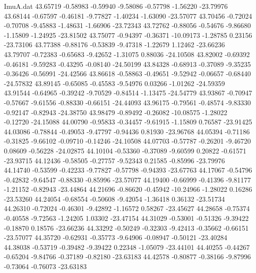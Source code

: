 \begin{filecontents}{ImuA.dat}
  43.65719   -0.58983   -0.59940   -9.58086   -0.57798   -1.56220  -23.79976
  43.68144   -0.67597   -0.46181   -9.77827   -1.40234   -1.63090  -23.57077
  43.70456   -0.72024   -0.70708   -9.45883   -1.48631   -1.66906  -23.72343
  43.72762   -0.88056   -0.54676   -9.86680   -1.15809   -1.24925  -23.81502
  43.75077   -0.94397   -0.36371  -10.09173   -1.28785    0.23156  -23.73106
  43.77388   -0.88176   -0.53839   -9.47318   -1.22679    1.12462  -23.66236
  43.79707   -0.72383   -0.65683   -9.42652   -1.31075    0.88036  -24.10508
  43.82002   -0.69392   -0.46181   -9.59283   -0.43295   -0.08140  -24.50199
  43.84328   -0.68913   -0.37089   -9.35235   -0.36426   -0.56991  -24.42566
  43.86618   -0.58863   -0.49651   -9.52942   -0.06657   -0.68440  -24.57832
  43.89145   -0.65085   -0.45583   -9.54976    0.03266   -1.01262  -24.59359
  43.91544   -0.64965   -0.39242   -9.70529   -0.84514   -1.13475  -24.54779
  43.93867   -0.70947   -0.57667   -9.61556   -0.88330   -0.66151  -24.44093
  43.96175   -0.79561   -0.48574   -9.83330   -0.92147   -0.82943  -24.38750
  43.98479   -0.89492   -0.26082  -10.08575   -1.28022   -0.12720  -24.15088
  44.00790   -0.95833   -0.34457   -9.61915   -1.15809    0.76587  -23.91425
  44.03086   -0.78844   -0.49053   -9.47797   -0.94436    0.81930  -23.96768
  44.05394   -0.71186   -0.31825   -9.66102   -0.09710   -0.14246  -24.10508
  44.07703   -0.57787   -0.26201   -9.46720    0.08609   -0.56228  -24.02875
  44.10104   -0.53360   -0.37089   -9.60599    0.20822   -0.61571  -23.93715
  44.12436   -0.58505   -0.27757   -9.52343    0.21585   -0.85996  -23.79976
  44.14740   -0.53599   -0.42233   -9.77827   -0.57798   -0.94393  -23.67763
  44.17067   -0.54796   -0.42832   -9.64547   -0.88330   -0.85996  -23.57077
  44.19400   -0.66999   -0.41396   -9.81177   -1.21152   -0.82943  -23.44864
  44.21696   -0.86620   -0.45942  -10.24966   -1.28022    0.16286  -23.53260
  44.24054   -0.68554   -0.50608   -9.42054   -1.36418    0.36132  -23.51734
  44.26310   -0.72024   -0.46301   -9.42892   -1.16572    0.58267  -23.45627
  44.28658   -0.75374   -0.40558   -9.72563   -1.24205    1.03302  -23.47154
  44.31029   -0.53001   -0.51326   -9.39422   -0.18870    0.18576  -23.66236
  44.33292   -0.50249   -0.32303   -9.42413   -0.35662   -0.66151  -23.57077
  44.35720   -0.62931   -0.35773   -9.64906   -0.08947   -0.50121  -23.40284
  44.38038   -0.53719   -0.39482   -9.39422    0.22348   -1.05079  -23.44101
  44.40255   -0.44267   -0.65204   -9.84766   -0.37189   -0.82180  -23.63183
  44.42578   -0.80877   -0.38166   -9.87996   -0.73064   -0.76073  -23.63183

\end{filecontents}
